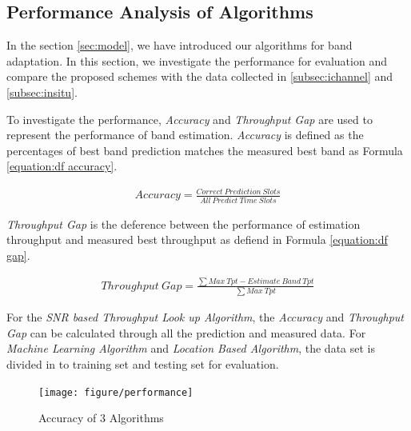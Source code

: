 \subsection{Performance Analysis of Algorithms}
\label{subsec:data process}

In the section \ref{sec:model}, we have introduced our algorithms for band adaptation. 
In this section, we investigate the performance for evaluation and compare the proposed schemes with the data collected in
\ref{subsec:ichannel} and \ref{subsec:insitu}.

To investigate the performance, \emph{Accuracy} and \emph{Throughput Gap} are used to represent the performance of band estimation.
\emph{Accuracy} is defined as the percentages of best band prediction matches the measured best band as Formula \ref{equation:df accuracy}.


\begin{align}
\label{equation:df accuracy}
Accuracy = \frac{Correct\ Prediction\ Slots}{All\ Predict\ Time\ Slots}
\end{align}



\emph{Throughput Gap} is the deference between the performance of estimation throughput and measured best throughput as defiend in Formula \ref{equation:df gap}.

\begin{align}
\label{equation:df gap}
Throughput\ Gap = \frac{\sum{Max\ Tpt- Estimate\ Band\ Tpt}}{\sum{Max\ Tpt}}
\end{align}


For the \emph{SNR based Throughput Look up Algorithm}, the \emph{Accuracy} and \emph{Throughput Gap} can be calculated through all the prediction and measured data.
For \emph{Machine Learning Algorithm} and \emph{Location Based Algorithm}, the data set is divided in to training set and testing set for evaluation.



\begin{figure}
\centering
\texttt{[image: figure/performance]}
\caption{Accuracy of 3 Algorithms}
\label{fig:performance}
\end{figure}

